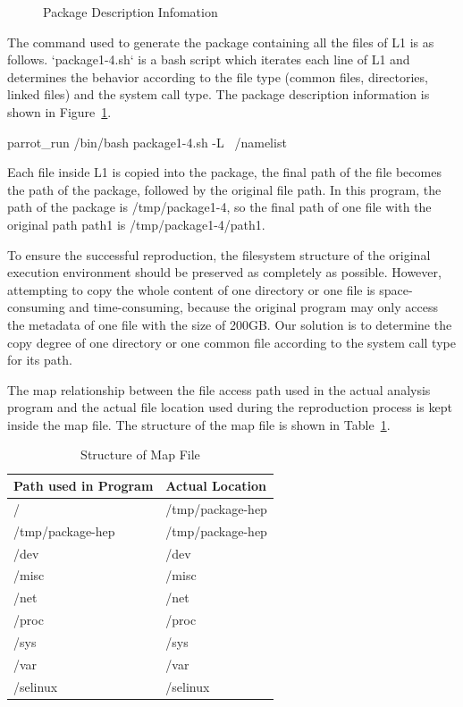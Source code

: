 \documentclass{acm_proc_article-sp}
\begin{document}
\begin{figure}
\centering
{}
\caption{Package Description Infomation}
\label{fig:package-info}
\end{figure}
The command used to generate the package containing all the files of L1 is as follows. 
`package1-4.sh` is a bash script which iterates each line of L1 and
determines the behavior according to the file type (common files, directories,
linked files) and the system call type.
The package description information is shown in Figure~\ref{fig:package-info}.

parrot\_run /bin/bash package1-4.sh -L ~/namelist

Each file inside L1 is copied into the package, the final path of the file becomes the path of the package, followed by the original file path. In this program, the path of the package is /tmp/package1-4, so the final path of one file with the original path path1 is /tmp/package1-4/path1.

To ensure the successful reproduction, the filesystem structure of the original
execution environment should be preserved as completely as possible. However,
attempting to copy the whole content of one directory or one file is
space-consuming and time-consuming, because the original program may only
access the metadata of one file with the size of 200GB. Our solution is to
determine the copy degree of one directory or one common file according to the
system call type for its path.

The map relationship between the file access path used in the actual analysis
program and the actual file location used during the reproduction process is
kept inside the map file. The structure of the map file is shown in Table~\ref{table:map-file}.

\begin{table}
    \centering
    \begin{tabular}{|l|l|}
    \hline
    Path used in Program & Actual Location \\ \hline
    / & /tmp/package-hep \\ \hline
    /tmp/package-hep & /tmp/package-hep \\ \hline
    /dev & /dev \\ \hline
    /misc & /misc\\ \hline
    /net & /net\\ \hline
    /proc & /proc\\ \hline
    /sys & /sys\\ \hline
    /var & /var\\ \hline
    /selinux & /selinux\\ \hline
    \end{tabular}
    \caption{Structure of Map File}
    \label{table:map-file}
\end{table}
\end{document}
